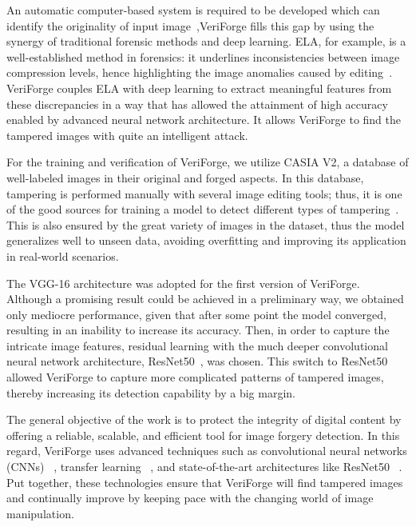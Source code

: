 \documentclass{ieeeaccess}
\begin{document}
An automatic computer-based system is required to be developed which can identify the originality of input image~\cite{9404748},VeriForge fills this gap by using the synergy of traditional forensic methods and deep learning. ELA, for example, is a well-established method in forensics: it underlines inconsistencies between image compression levels, hence highlighting the image anomalies caused by editing~\cite{singh2021image}. VeriForge couples ELA with deep learning to extract meaningful features from these discrepancies in a way that has allowed the attainment of high accuracy enabled by advanced neural network architecture. It allows VeriForge to find the tampered images with quite an intelligent attack.

For the training and verification of VeriForge, we utilize CASIA V2, a database of well-labeled images in their original and forged aspects. In this database, tampering is performed manually with several image editing tools; thus, it is one of the good sources for training a model to detect different types of tampering~\cite{7412439}. This is also ensured by the great variety of images in the dataset, thus the model generalizes well to unseen data, avoiding overfitting and improving its application in real-world scenarios.

The VGG-16 architecture was adopted for the first version of VeriForge. Although a promising result could be achieved in a preliminary way, we obtained only mediocre performance, given that after some point the model converged, resulting in an inability to increase its accuracy. Then, in order to capture the intricate image features, residual learning with the much deeper convolutional neural network architecture, ResNet50~\cite{simonyan2015deepconvolutionalnetworkslargescale}, was chosen. This switch to ResNet50 allowed VeriForge to capture more complicated patterns of tampered images, thereby increasing its detection capability by a big margin.


The general objective of the work is to protect the integrity of digital content by offering a reliable, scalable, and efficient tool for image forgery detection. In this regard, VeriForge uses advanced techniques such as convolutional neural networks (CNNs) ~\cite{thepade2021image}, transfer learning~\cite{han2020scene} , and state-of-the-art architectures like ResNet50~\cite{he2016deep} . Put together, these technologies ensure that VeriForge will find tampered images and continually improve by keeping pace with the changing world of image manipulation.
\end{document}
